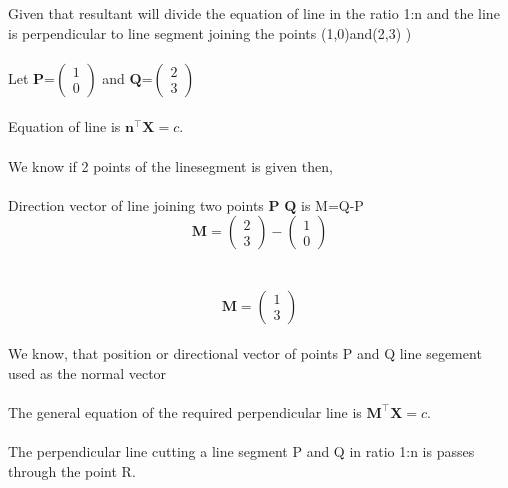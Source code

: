 \documentclass[journal,12pt,twocolumn]{article}
\newcommand{\myvec}[1]{\ensuremath{\begin{pmatrix}#1\end{pmatrix}}}
\let\vec\mathbf
\begin{document}
Given that resultant will divide the equation of line in the ratio 1:n and the line is perpendicular to line segment joining the points (1,0)and(2,3)  ) \\
\\
Let ${\vec{P}}$=$\myvec{
  1\\
  0}$
 and ${\vec{Q}}$=$\myvec{
  2\\
  3}$
\\
\\
Equation of line is ${\vec{n^{\top}}\vec{X}} = c$.
\\
\\
We know if 2 points of the linesegment is given then,\\
\\
Direction vector of line joining two points  ${\vec{P}}$ ${\vec{Q}}$ is M=Q-P\\

\begin{equation}
	\vec{M}=
     \myvec{
  2\\
  3
 }-  \myvec{
  1\\
  0
 }
  \label{eq-2}
\end{equation}
\\
\\
\begin{equation}
	\vec{M}=
     \myvec{
  1\\
  3
 }
   \label{eq-2}
\end{equation}
\\
We know, that position or  directional vector of points P and Q line segement used as the normal vector
\\
\\
 The general equation of the required perpendicular line is
 ${\vec{M^{\top}}\vec{X}} = c$.
 \\
 \\
 The perpendicular line cutting a line segment P and Q in ratio 1:n is passes through the point R.
 
\end{document}
